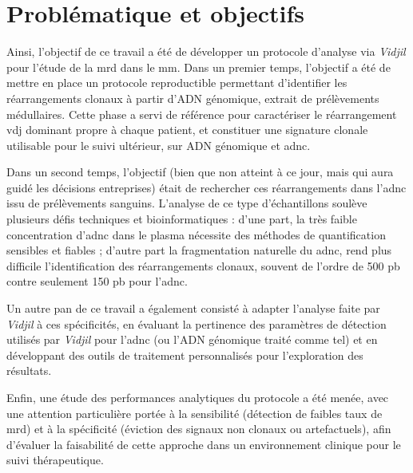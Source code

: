 
\chapter{Problématique et objectifs}

Ainsi, l'objectif de ce travail a été de développer un protocole d'analyse via
\textit{Vidjil} pour l'étude de la \gls{mrd} dans le \gls{mm}. Dans un premier
temps, l'objectif a été de mettre en place un protocole reproductible
permettant d'identifier les réarrangements clonaux à partir d'ADN génomique,
extrait de prélèvements médullaires. Cette phase a servi de référence pour
caractériser le réarrangement \gls{vdj} dominant propre à chaque patient, et
constituer une signature clonale utilisable pour le suivi ultérieur, sur ADN
génomique et \gls{adnc}.

\vspace{1em}

Dans un second temps, l'objectif (bien que non atteint à ce jour, mais qui aura
guidé les décisions entreprises) était de rechercher ces réarrangements dans
l'\gls{adnc} issu de prélèvements sanguins. L'analyse de ce type d'échantillons
soulève plusieurs défis techniques et bioinformatiques : d'une part, la très
faible concentration d'\gls{adnc} dans le plasma nécessite des méthodes de
quantification sensibles et fiables ; d'autre part la fragmentation naturelle
du \gls{adnc}, rend plus difficile l'identification des réarrangements clonaux,
souvent de l'ordre de 500 pb contre seulement 150 pb pour l'\gls{adnc}.

\vspace{1em}

Un autre pan de ce travail a également consisté à adapter l'analyse faite par
\textit{Vidjil} à ces spécificités, en évaluant la pertinence des paramètres de
détection utilisés par \textit{Vidjil} pour l'\gls{adnc} (ou l'ADN génomique
traité comme tel) et en développant des outils de traitement personnalisés pour
l'exploration des résultats.

\vspace{1em}

Enfin, une étude des performances analytiques du protocole a été menée, avec
une attention particulière portée à la sensibilité (détection de faibles taux
de \gls{mrd}) et à la spécificité (éviction des signaux non clonaux ou
artefactuels), afin d'évaluer la faisabilité de cette approche dans un
environnement clinique pour le suivi thérapeutique.

